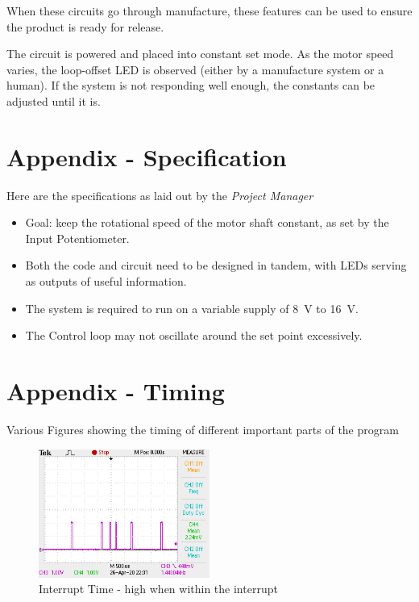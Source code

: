 \documentclass[a4paper]{article}
\begin{document}
When these circuits go through manufacture, these features can be used to ensure the product is ready for release.

The circuit is powered and placed into constant set mode. As the motor speed varies, the loop-offset LED is observed (either by a manufacture system or a human). If the system is not responding well enough, the constants can be adjusted until it is.

 



\newpage
\section{Appendix - Specification} \label{sect:specificaton}
Here are the specifications as laid out by the \textit{Project Manager} 
\begin{itemize}
    \item Goal: keep the rotational speed of the motor shaft constant, as set by the Input Potentiometer.
    
    \item Both the code and circuit need to be designed in tandem, with LEDs serving as outputs of useful information.
    
    \item The system is required to run on a variable supply of \SI{8}{\volt} to \SI{16}{\volt}.
    
    \item The Control loop may not oscillate around the set point excessively.
\end{itemize} 


\newpage
\section{Appendix - Timing} \label{sect:timing}
Various Figures showing the timing of different important parts of the program

\begin{figure}[h!]
    \centering
    \includegraphics[width=0.5\textwidth]{img/InterruptTiming.png}
    \caption{Interrupt Time - high when within the interrupt}
\end{figure}
\end{document}
